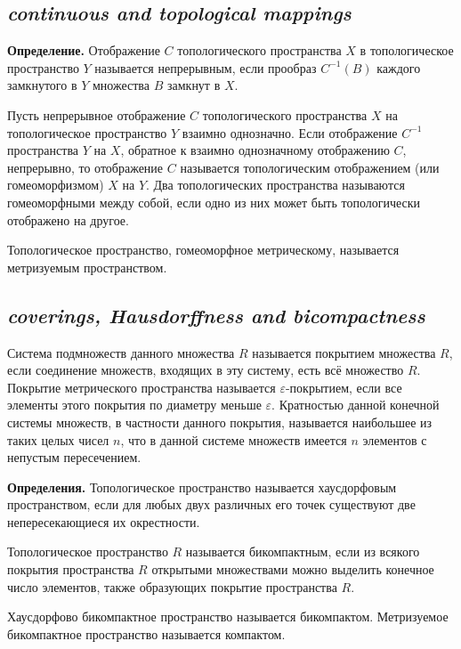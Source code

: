 \subsection*{ \textit{continuous and topological mappings}}
\begin{rusblock}
\textbf{Определение.} Отображение $C$ топологического пространства $X$ в топологическое пространство $Y$ называется непрерывным, если прообраз $C^{-1}(B)$ каждого замкнутого в $Y$ множества $B$ замкнут в $X$.

Пусть непрерывное отображение $C$ топологического пространства $X$ на топологическое пространство $Y$ взаимно однозначно. Если отображение $C^{-1}$ пространства $Y$ на $X$, обратное к взаимно однозначному отображению $C$, непрерывно, то отображение $C$ называется топологическим отображением (или гомеоморфизмом) $X$ на $Y$. Два топологических пространства называются гомеоморфными между собой, если одно из них может быть топологически отображено на другое.

Топологическое пространство, гомеоморфное метрическому, называется метризуемым пространством.
\end{rusblock}

\subsection*{ \textit{coverings, Hausdorffness and bicompactness}}
\begin{rusblock}
Система подмножеств данного множества $R$ называется покрытием множества $R$, если соединение множеств, входящих в эту систему, есть всё множество $R$. Покрытие метрического пространства называется $\varepsilon$-покрытием, если все элементы этого покрытия по диаметру меньше $\varepsilon$. Кратностью данной конечной системы множеств, в частности данного покрытия, называется наибольшее из таких целых чисел $n$, что в данной системе множеств имеется $n$ элементов с непустым пересечением.

\textbf{Определения.} Топологическое пространство называется хаусдорфовым пространством, если для любых двух различных его точек существуют две непересекающиеся их окрестности.

Топологическое пространство $R$ называется бикомпактным, если из всякого покрытия пространства $R$ открытыми множествами можно выделить конечное число элементов, также образующих покрытие пространства $R$.

Хаусдорфово бикомпактное пространство называется бикомпактом. Метризуемое бикомпактное пространство называется компактом.
\end{rusblock}

